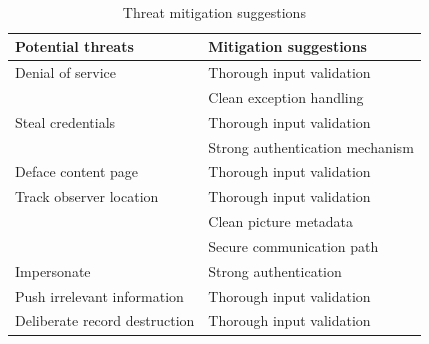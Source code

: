 \\

\begin{table}[htb]
	\centering
    \begin{tabular}{| l | l |}
		\hline
		Potential threats & Mitigation suggestions \\
		\hline \hline
		Denial of service	& Thorough input validation \\& Clean exception handling \\
		Steal credentials	& Thorough input validation\\	& Strong authentication mechanism \\
        Deface content page & Thorough input validation\\
        Track observer location & Thorough input validation\\ & Clean picture metadata\\ & Secure communication path\\
        Impersonate & Strong authentication\\
        Push irrelevant information & Thorough input validation\\
        Deliberate record destruction & Thorough input validation\\
        
		\hline
    \end{tabular}
  \caption{Threat mitigation suggestions}
\end{table}
